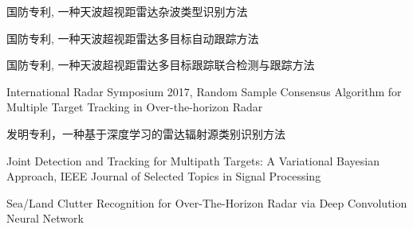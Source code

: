 国防专利, 一种天波超视距雷达杂波类型识别方法

国防专利, 一种天波超视距雷达多目标自动跟踪方法

国防专利, 一种天波超视距雷达多目标跟踪联合检测与跟踪方法

International Radar Symposium 2017, Random Sample Consensus Algorithm for Multiple Target Tracking in Over-the-horizon Radar

发明专利，一种基于深度学习的雷达辐射源类别识别方法

Joint Detection and Tracking for Multipath Targets: A Variational Bayesian Approach, IEEE Journal of Selected Topics in Signal Processing

Sea/Land Clutter Recognition for Over-The-Horizon Radar
via Deep Convolution Neural Network